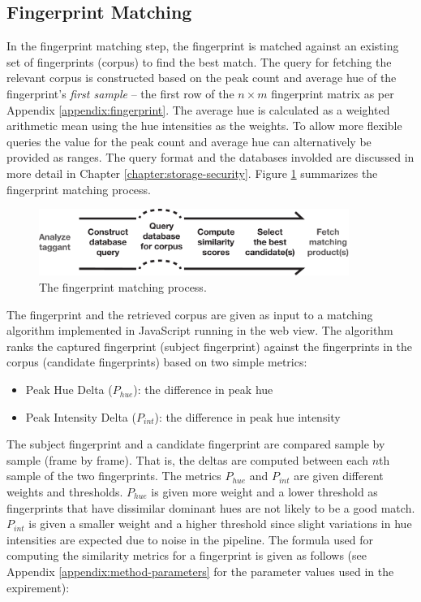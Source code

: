 \documentclass[thesis.tex]{subfiles}
\begin{document}
\subsection{Fingerprint Matching}
\label{chapter:fingerprint-matching}

In the fingerprint matching step, the fingerprint is matched against an existing set of fingerprints (corpus) to find the best match. The query for fetching the relevant corpus is constructed based on the peak count and average hue of the fingerprint's \emph{first sample} -- the first row of the $n \times m$ fingerprint matrix as per Appendix \ref{appendix:fingerprint}. The average hue is calculated as a weighted arithmetic mean using the hue intensities as the weights. To allow more flexible queries the value for the peak count and average hue can alternatively be provided as ranges. The query format and the databases involded are discussed in more detail in Chapter \ref{chapter:storage-security}. Figure \ref{figure:matching-process} summarizes the fingerprint matching process.

\begin{figure}[h]
\centering \includegraphics[width=0.9\textwidth,height=\textheight,keepaspectratio=true]{images/design_implementation/matching_process}
\vspace{-3mm}
\caption{The fingerprint matching process.\label{figure:matching-process}}
\end{figure}

The fingerprint and the retrieved corpus are given as input to a matching algorithm implemented in JavaScript running in the web view. The algorithm ranks the captured fingerprint (subject fingerprint) against the fingerprints in the corpus (candidate fingerprints) based on two simple metrics:

\begin{itemize}
	\item Peak Hue Delta ($P_{hue}$): the difference in peak hue
	\item Peak Intensity Delta ($P_{int}$): the difference in peak hue intensity
\end{itemize}

The subject fingerprint and a candidate fingerprint are compared sample by sample (frame by frame). That is, the deltas are computed between each $n$th sample of the two fingerprints. The metrics $P_{hue}$ and $P_{int}$ are given different weights and thresholds. $P_{hue}$ is given more weight and a lower threshold as fingerprints that have dissimilar dominant hues are not likely to be a good match. $P_{int}$ is given a smaller weight and a higher threshold since slight variations in hue intensities are expected due to noise in the pipeline. The formula used for computing the similarity metrics for a fingerprint is given as follows (see Appendix \ref{appendix:method-parameters} for the parameter values used in the expirement):
\end{document}
